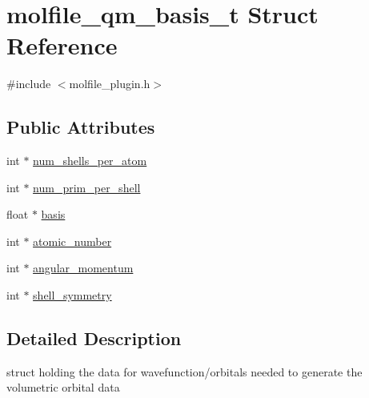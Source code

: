 \hypertarget{structmolfile__qm__basis__t}{\section{molfile\-\_\-qm\-\_\-basis\-\_\-t \-Struct \-Reference}
\label{structmolfile__qm__basis__t}
}


{\ttfamily \#include $<$molfile\-\_\-plugin.\-h$>$}

\subsection*{\-Public \-Attributes}
\begin{DoxyCompactItemize}
\item 
int $\ast$ \hyperlink{structmolfile__qm__basis__t_a899c773945951aeb09cf3b582de7f242}{num\-\_\-shells\-\_\-per\-\_\-atom}
\item 
int $\ast$ \hyperlink{structmolfile__qm__basis__t_a7e3de0b8804af1da9133607da286dd1d}{num\-\_\-prim\-\_\-per\-\_\-shell}
\item 
float $\ast$ \hyperlink{structmolfile__qm__basis__t_a8d635f5a6ef7db7de77dc057d00a3f31}{basis}
\item 
int $\ast$ \hyperlink{structmolfile__qm__basis__t_a46638dd77f5549b96dbd0818a2116f4b}{atomic\-\_\-number}
\item 
int $\ast$ \hyperlink{structmolfile__qm__basis__t_a12499d655a4c7b038bab7d14619857cc}{angular\-\_\-momentum}
\item 
int $\ast$ \hyperlink{structmolfile__qm__basis__t_ab8cec531b4200bfe14b5b94dbf79b3f8}{shell\-\_\-symmetry}
\end{DoxyCompactItemize}


\subsection{\-Detailed \-Description}
struct holding the data for wavefunction/orbitals needed to generate the volumetric orbital data 


